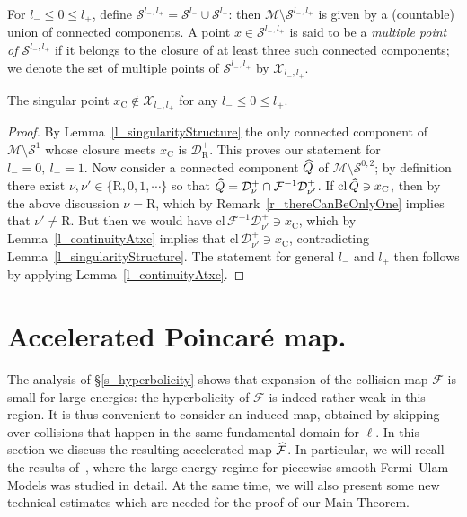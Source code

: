 \documentclass[AHL, Unicode, longabstracts,published]{cedram}
\newcommand{\nin}{\not\in}
\newcommand{\cl}[1]{\mathrm{cl}\,#1}
\newcommand{\inv}{^{-1}}
\newcommand{\crit}{\mathrm{C}}
\newcommand{\xc}{x_\crit}
\newcommand{\cm}{\mathcal{F}}
\newcommand{\cell}{\mathcal{D}}
\newcommand{\csp}{\mathcal{M}}
\newcommand{\cmp}{\hat\cm}
\newcommand{\recoPrivate}{\mathrm{R}}
\newcommand{\backReco}{{\cell^+_{\recoPrivate}}}
\newcommand{\singPrivate}{\mathcal{S}}
\newcommand{\sing}[1]{\singPrivate^{#1}}
\newcommand{\cc}{\hat Q}
\newcommand{\indCell}{\nu}
\newcommand{\multPrivate}{\mathcal{X}}
\newcommand{\mult}[1]{\multPrivate_{#1}}
\let\oldhat\hat
\renewcommand*{\hat}[1]{\mathchoice{\widehat{#1}}{\widehat{#1}}{\oldhat{#1}}{\oldhat{#1}}}
\begin{document}
For $l_- \le 0 \le l_+$, define $\sing{l_-,l_+} = \sing{l_-}\cup\sing{l_+}$: then $\csp\setminus\sing{l_-,l_+}$ is given by a (countable) union of connected components. A point $x\in\sing{l_-,l_+}$ is said to be a
\emph{multiple point of $\sing{l_-,l_+}$} if it belongs to the closure of at least three such connected components; we denote the set of multiple points of $\sing{l_-,l_+}$ by $\mult{l_-,l_+}$.


\begin{lemm}\label{l_singularPointNotMultiple}
The singular point $\xc\nin\mult{l_-,l_+}$ for any $l_- \le 0 \le l_+$.
\end{lemm}
\begin{proof}
By Lemma~\ref{l_singularityStructure} the only connected component of $\csp\setminus\sing1$ whose closure meets $\xc$ is $\backReco$. This proves our statement for $l_- = 0,\ l_+ = 1$. Now consider a connected component $\cc$ of $\csp\setminus\sing{0,2}$; by definition there exist $\indCell,\indCell'\in\{\recoPrivate,0,1,\cdots\}$ so that $\cc = \cell^+_\indCell\cap\cm\inv\cell^+_{\indCell'}$. If $\cl\cc\ni\xc$, then by the above discussion $\indCell = \recoPrivate$, which by Remark~\ref{r_thereCanBeOnlyOne} implies that $\indCell'\ne\recoPrivate$. But then we would have $\cl\cm\inv\cell^+_{\indCell'}\ni\xc$, which by Lemma~\ref{l_continuityAtxc} implies that $\cl\cell^+_{\indCell'}\ni\xc$, contradicting Lemma~\ref{l_singularityStructure}. The statement for general $l_-$ and $l_+$ then follows by applying Lemma~\ref{l_continuityAtxc}.
\end{proof}

\section{Accelerated Poincaré map.}\label{sec:accel-poinc-map}
The analysis of \S\ref{s_hyperbolicity} shows that expansion of the collision map $\cm$ is small for large energies: the hyperbolicity of $\cm$ is indeed rather weak in this region. It is thus convenient to consider an induced map, obtained by skipping over collisions that happen in the same fundamental domain for $\ell$. In this section we discuss the resulting accelerated map $\cmp$. In particular, we will recall the results of~\cite{fum}, where the large energy regime for piecewise smooth Fermi--Ulam Models was studied in detail. At the same time, we will also present some new technical estimates which are needed for the proof of our Main Theorem.
\end{document}
